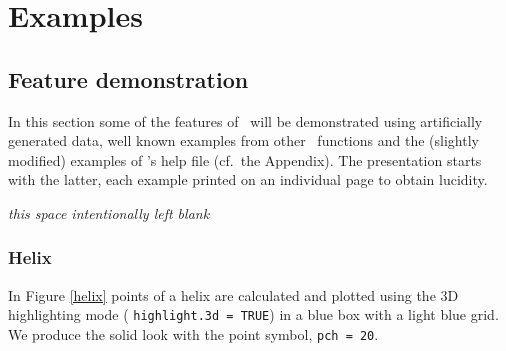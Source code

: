 \section{Examples\label{examples}}
\subsection{Feature demonstration\label{artificial}}
In this section some of the features of \sdd\ will be demonstrated using
artificially generated data, well known examples from other \RR\ functions
and the (slightly modified) examples of \sdd 's help file (cf.\ the Appendix).
The presentation starts with the latter, each example printed
on an individual page to obtain lucidity.

\vspace*{30mm}
\begin{center}\sl\small this space intentionally left blank
\end{center}

\clearpage\subsubsection{Helix}
In Figure \ref{helix} points of a helix are
calculated and plotted using the 3D highlighting mode (%
\verb|highlight.3d = TRUE|) in a blue box with a light blue grid.  We
produce the solid look with the point symbol, \texttt{pch = 20}.

